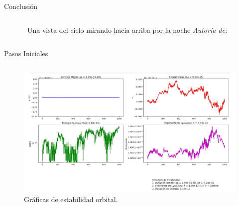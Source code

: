 \begin{frame}{Conclusión}
\begin{columns}
\begin{column}{0.4\textwidth}
\begin{figure}[H]
{                }
                \vspace{-0.25cm}
                \caption{\tiny~Una vista del cielo mirando hacia arriba por la noche \textit{Autoría de:}~\cite{dyer_cielo_nocturno_2021}}%
                \label{fig:Matplotlib_logo}
            \end{figure}
        \end{column}
    \end{columns}
\end{frame}

\begin{frame}{Pasos Iniciales}
    \begin{columns}[T] 
        \begin{column}{0.55\textwidth} 
            \begin{figure}
                \centering
                \includegraphics[width=\textwidth]{img/conclusion/metricas.jpeg} 
                \caption{Gráficas de estabilidad orbital.}
            \end{figure}
        \end{column}


\end{columns}
\end{frame}
